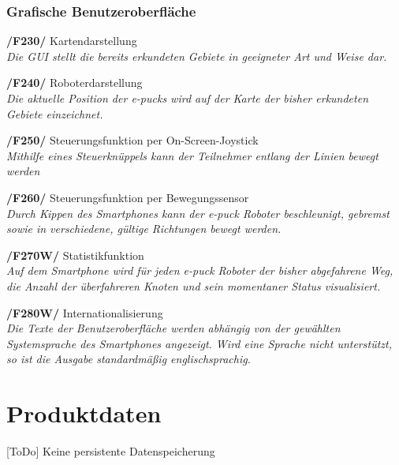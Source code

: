 \documentclass[10pt,a4paper]{article}
\let\oldsection\section
\renewcommand{\section}{\newpage \oldsection}
\begin{document}
			\subsubsection{Grafische Benutzeroberfläche}
				\begin{list}{}{\leftmargin=1cm}
					\item[\textbf{/F230/}] Kartendarstellung
						\\ \textsl{Die GUI stellt die bereits erkundeten Gebiete in geeigneter Art und Weise dar.}	
					\item[\textbf{/F240/}] Roboterdarstellung
						\\ \textsl{Die aktuelle Position der e-pucks wird auf der Karte der bisher erkundeten Gebiete
							einzeichnet.}	
					\item[\textbf{/F250/}] Steuerungsfunktion per On-Screen-Joystick
						\\ \textsl{Mithilfe eines Steuerknüppels kann der Teilnehmer entlang der Linien bewegt werden}
					\item[\textbf{/F260/}] Steuerungsfunktion per Bewegungssensor	
						\\ \textsl{Durch Kippen des Smartphones kann der e-puck Roboter beschleunigt, gebremst sowie in verschiedene, gültige
							Richtungen bewegt werden.}
					\item[\textbf{/F270W/}] Statistikfunktion	
						\\ \textsl{Auf dem Smartphone wird für jeden e-puck Roboter der bisher abgefahrene Weg, die Anzahl der überfahreren
							Knoten und sein momentaner Status visualisiert.}							
					\item[\textbf{/F280W/}] Internationalisierung	
						\\ \textsl{Die Texte der Benutzeroberfläche werden abhängig von der gewählten Systemsprache des Smartphones
							angezeigt. Wird eine Sprache nicht unterstützt, so ist die Ausgabe standardmäßig englischsprachig.}
				\end{list}
				
	\section{Produktdaten}
		[ToDo] Keine persistente Datenspeicherung
		
\end{document}
